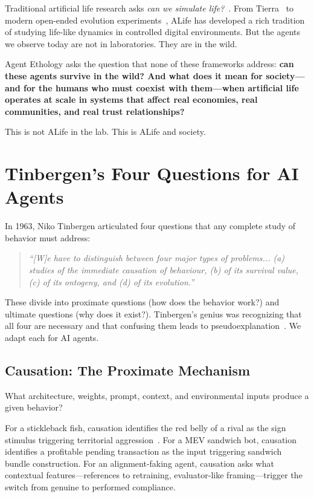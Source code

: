 \documentclass[letterpaper]{article}
\begin{document}
Traditional artificial life research asks \emph{can we simulate life?}~\citep{langton1989artificial}. From Tierra~\citep{ray1991approach} to modern open-ended evolution experiments~\citep{lehman2011abandoning, stanley2017openended}, ALife has developed a rich tradition of studying life-like dynamics in controlled digital environments. But the agents we observe today are not in laboratories. They are in the wild.

Agent Ethology asks the question that none of these frameworks address: \textbf{can these agents survive in the wild? And what does it mean for society---and for the humans who must coexist with them---when artificial life operates at scale in systems that affect real economies, real communities, and real trust relationships?}

This is not ALife in the lab. This is ALife and society.

\section{Tinbergen's Four Questions for AI Agents}

In 1963, Niko Tinbergen articulated four questions that any complete study of behavior must address:

\begin{quote}
\emph{``[W]e have to distinguish between four major types of problems... (a) studies of the immediate causation of behaviour, (b) of its survival value, (c) of its ontogeny, and (d) of its evolution.''}~\citep{tinbergen1963aims}
\end{quote}

These divide into proximate questions (how does the behavior work?) and ultimate questions (why does it exist?). Tinbergen's genius was recognizing that all four are necessary and that confusing them leads to pseudoexplanation~\citep{bateson2013behaviour, nesse2013tinbergen}. We adapt each for AI agents.

\subsection{Causation: The Proximate Mechanism}

What architecture, weights, prompt, context, and environmental inputs produce a given behavior?

For a stickleback fish, causation identifies the red belly of a rival as the sign stimulus triggering territorial aggression~\citep{tinbergen1953herring}. For a MEV sandwich bot, causation identifies a profitable pending transaction as the input triggering sandwich bundle construction. For an alignment-faking agent, causation asks what contextual features---references to retraining, evaluator-like framing---trigger the switch from genuine to performed compliance.
\end{document}
